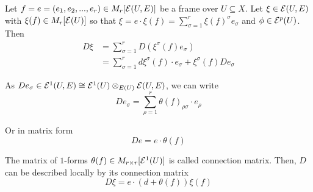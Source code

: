\begin{comment}
\textbf{Question}

$\wedge: \E^p(U) \times  \E^q(U) \to  \E^p(U) \wedge  \E^q(U) = \E^{p+q}(U)$ is defined by the following

$$
	(f \wedge g)(x) = f(x) \wedge g(x)
$$

for $f \in \E^p(U), g \in \E^q(U)$ and $x \in U$

\begin{enumerate}
	\item In the definition of wedge product by universal property, $A \wedge B$ is defined if $A = B$ since we need the skew-symmetric property. Why do we use the same symbol here? and is there an axiomatic defintion for that case?
	
	\item Is the definition of $\wedge: \E^p \times \E^q(U, E)$ above correct ($t$ is probably bilinear)? if yes, how to prove the map $t: A \times (B \otimes C) \to (A \wedge B) \otimes C$ is well-defined. In many books, I only find the definition of connection for the case $p=0$.
\end{enumerate}

	\note{Note: in many books, connection is usually defined by the first order $p=1$, that is, $D: \E(X, E) \to \E^1(X, E)$. Indeed, the degree-$p$ connection can be defined from the the degree-$0$ version will be shown in the subsequent parts}
\end{definition}
\end{comment}

\begin{remark}
	Let $f = e = (e_1, e_2, ..., e_r) \in M_r[\mathcal{E}(U, E)]$ be a frame over $U \subseteq X$. Let $\xi \in \mathcal{E}(U, E)$ with $\xi(f) \in M_r[\mathcal{E}(U)]$ so that $\xi = e \cdot \xi(f) = \sum_{\sigma=1}^r \xi(f)^\sigma e_\sigma$ and $\phi \in \mathcal{E}^p(U)$. Then
	\begin{align*}
		D \xi
		&= \sum_{\sigma=1}^r D (\xi^\sigma(f) e_\sigma)\\
		&= \sum_{\sigma=1}^r d \xi^\sigma(f) \cdot e_\sigma + \xi^\sigma(f) D e_\sigma
	\end{align*}
	
	As $D e_\sigma \in \mathcal{E}^1(U, E) \cong \mathcal{E}^1(U) \otimes_{E(U)} \mathcal{E}(U, E)$, we can write
	$$
		De_\sigma = \sum_{\rho=1}^r \theta(f)_{\rho \sigma} \cdot e_\rho
	$$
	
	Or in matrix form
	$$
		D e = e \cdot \theta(f)
	$$
	
	The matrix of $1$-forms $\theta(f) \in M_{r \times r}[\mathcal{E}^1(U)]$ is called connection matrix. Then, $D$ can be described locally by its connection matrix
	$$
		D \xi = e \cdot (d + \theta(f)) \xi(f)
	$$
\end{remark}

